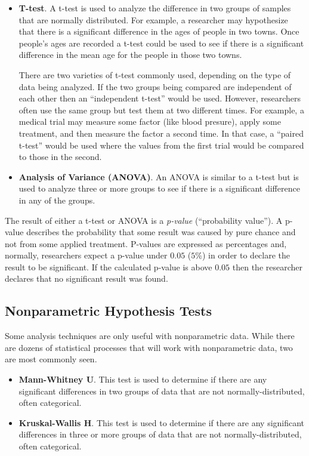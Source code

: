 \begin{itemize}
	\item \textbf{T-test}. A t-test is used to analyze the difference in two groups of samples that are normally distributed. For example, a researcher may hypothesize that there is a significant difference in the ages of people in two towns. Once people's ages are recorded a t-test could be used to see if there is a significant difference in the mean age for the people in those two towns.
	
	There are two varieties of t-test commonly used, depending on the type of data being analyzed. If the two groups being compared are independent of each other then an ``independent t-test'' would be used. However, researchers often use the same group but test them at two different times. For example, a medical trial may measure some factor (like blood presure), apply some treatment, and then measure the factor a second time. In that case, a ``paired t-test'' would be used where the values from the first trial would be compared to those in the second.
	
	\item \textbf{Analysis of Variance (ANOVA)}. An ANOVA is similar to a t-test but is used to analyze three or more groups to see if there is a significant difference in any of the groups.
\end{itemize}

The result of either a t-test or ANOVA is a \textit{p-value} (``probability value''). A p-value describes the probability that some result was caused by pure chance and not from some applied treatment. P-values are expressed as percentages and, normally, researchers expect a p-value under $ 0.05 $ ($ 5\% $) in order to declare the result to be significant. If the calculated p-value is above $ 0.05 $ then the researcher declares that no significant result was found.

\subsection{Nonparametric Hypothesis Tests}

Some analysis techniques are only useful with \gls{nonparametric} data. While there are dozens of statistical processes that will work with nonparametric data, two are most commonly seen.

\begin{itemize}
	\item \textbf{Mann-Whitney U}. This test is used to determine if there are any significant differences in two groups of data that are not normally-distributed, often categorical. 
	
	\item \textbf{Kruskal-Wallis H}. This test is used to determine if there are any significant differences in three or more groups of data that are not normally-distributed, often categorical. 
\end{itemize}

